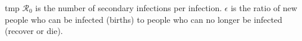 tmp
${\mathcal R_0}$ is the number of secondary infections per infection.
$\epsilon$ is the ratio of new people who can be infected (births) to people who can no longer be infected (recover or die).
